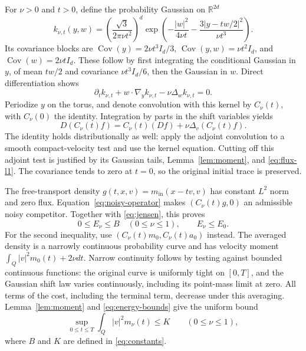 \documentclass[11pt]{article}
\newcommand{\R}{\mathbb R}
\newcommand{\mi}{m_{\mathrm{in}}}
\newcommand{\D}{D}
\begin{document}
For $\nu>0$ and $t>0$, define the probability Gaussian on $\R^{2d}$
\begin{equation}\label{eq:kinetic-kernel}
 k_{\nu,t}(y,w)=
 \left(\frac{\sqrt3}{2\pi\nu t^2}\right)^d
 \exp\left(-\frac{|w|^2}{4\nu t}
           -\frac{3|y-tw/2|^2}{\nu t^3}\right).
\end{equation}
Its covariance blocks are
$\operatorname{Cov}(y)=2\nu t^3I_d/3$,
$\operatorname{Cov}(y,w)=\nu t^2I_d$, and
$\operatorname{Cov}(w)=2\nu tI_d$.
These follow by first integrating the conditional Gaussian in $y$,
of mean $tw/2$ and covariance $\nu t^3I_d/6$, then the Gaussian in $w$.
Direct differentiation shows
\[
 \partial_t k_{\nu,t}+w\cdot\nabla_yk_{\nu,t}
 -\nu\Delta_wk_{\nu,t}=0.
\]
Periodize $y$ on the torus, and denote convolution with this kernel by
$C_\nu(t)$, with $C_\nu(0)$ the identity. Integration by parts in the
shift variables yields
\begin{equation}\label{eq:noisy-operator}
 \D(C_\nu(t)f)=C_\nu(t)(\D f)+\nu\Delta_v(C_\nu(t)f).
\end{equation}
The identity holds distributionally as well: apply the adjoint convolution
to a smooth compact-velocity test and use the kernel equation.
Cutting off this adjoint test is justified by its Gaussian tails,
Lemma~\ref{lem:moment}, and \eqref{eq:flux-l1}.
The covariance tends to zero at $t=0$, so the original initial trace
is preserved.

The free-transport density $g(t,x,v)=\mi(x-tv,v)$ has constant $L^2$
norm and zero flux. Equation~\eqref{eq:noisy-operator} makes
$(C_\nu(t)g,0)$ an admissible noisy competitor. Together with
\eqref{eq:jensen}, this proves
\begin{equation}\label{eq:energy-bounds}
 0\leq E_\nu\leq B\quad(0\leq\nu\leq1),\qquad E_\nu\leq E_0.
\end{equation}
For the second inequality, use
$(C_\nu(t)m_0,C_\nu(t)a_0)$ instead. The averaged density is a
narrowly continuous probability curve and has velocity moment
$\int_Q|v|^2m_0(t)+2\nu dt$.
Narrow continuity follows by testing against bounded continuous functions:
the original curve is uniformly tight on $[0,T]$, and the Gaussian
shift law varies continuously, including its point-mass limit at zero.
All terms of the cost, including the terminal term, decrease under
this averaging.
Lemma~\ref{lem:moment} and \eqref{eq:energy-bounds} give the uniform bound
\begin{equation}\label{eq:uniform-moment}
 \sup_{0\leq t\leq T}\int_Q|v|^2m_\nu(t)\leq K
 \qquad(0\leq\nu\leq1),
\end{equation}
where $B$ and $K$ are defined in \eqref{eq:constants}.
\end{document}
